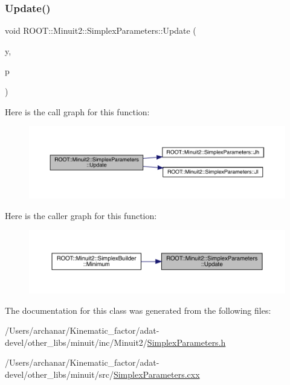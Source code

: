 \subsubsection{\texorpdfstring{Update()}{Update()}\hspace{0.1cm}{\footnotesize\ttfamily [3/3]}}
{\footnotesize\ttfamily void R\+O\+O\+T\+::\+Minuit2\+::\+Simplex\+Parameters\+::\+Update (\begin{DoxyParamCaption}\item[{double}]{y,  }\item[{const \mbox{\hyperlink{namespaceROOT_1_1Minuit2_a62ed97730a1ca8d3fbaec64a19aa11c9}{Mn\+Algebraic\+Vector}} \&}]{p }\end{DoxyParamCaption})}

Here is the call graph for this function\+:
\nopagebreak
\begin{figure}[H]
\begin{center}
\leavevmode
\includegraphics[width=350pt]{d7/da2/classROOT_1_1Minuit2_1_1SimplexParameters_aa9536cc9c7754ce308160d5e456ac54f_cgraph}
\end{center}
\end{figure}
Here is the caller graph for this function\+:
\nopagebreak
\begin{figure}[H]
\begin{center}
\leavevmode
\includegraphics[width=350pt]{d7/da2/classROOT_1_1Minuit2_1_1SimplexParameters_aa9536cc9c7754ce308160d5e456ac54f_icgraph}
\end{center}
\end{figure}


The documentation for this class was generated from the following files\+:\begin{DoxyCompactItemize}
\item 
/\+Users/archanar/\+Kinematic\+\_\+factor/adat-\/devel/other\+\_\+libs/minuit/inc/\+Minuit2/\mbox{\hyperlink{adat-devel_2other__libs_2minuit_2inc_2Minuit2_2SimplexParameters_8h}{Simplex\+Parameters.\+h}}\item 
/\+Users/archanar/\+Kinematic\+\_\+factor/adat-\/devel/other\+\_\+libs/minuit/src/\mbox{\hyperlink{adat-devel_2other__libs_2minuit_2src_2SimplexParameters_8cxx}{Simplex\+Parameters.\+cxx}}\end{DoxyCompactItemize}
